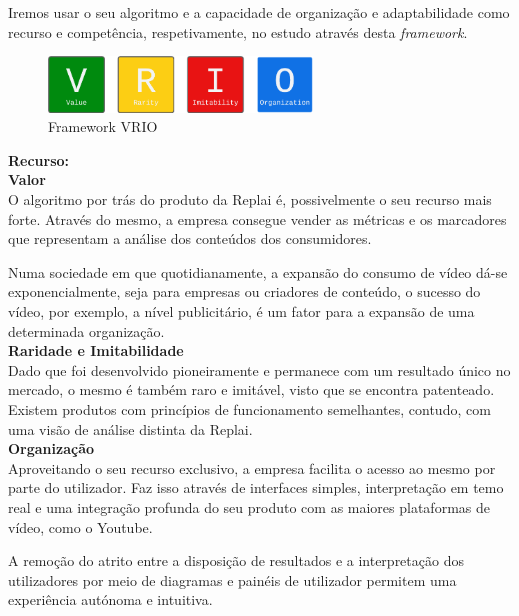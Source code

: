 Iremos usar o seu algoritmo e a capacidade de organização e adaptabilidade como recurso e competência, respetivamente, no estudo através desta \textit{framework}.\\

\begin{figure}[ht]
    \centering
        \includegraphics[width=7cm]{images/vrio.png}
        \caption{Framework VRIO}
        \label{fig:vrio}
\end{figure}

\noindent \textbf{Recurso:} \\

\noindent \textbf{Valor}\\
 
O algoritmo por trás do produto da Replai é, possivelmente o seu recurso mais forte. Através do  mesmo, a empresa consegue vender as métricas e os marcadores que representam a análise dos conteúdos dos consumidores.
  
Numa sociedade em que quotidianamente, a expansão do consumo de vídeo dá-se exponencialmente, seja para empresas ou criadores de conteúdo, o sucesso do vídeo, por exemplo, a nível publicitário, é um fator para a expansão de uma determinada organização.\\

\noindent \textbf{Raridade e Imitabilidade}\\

Dado que foi desenvolvido pioneiramente e permanece com um resultado único no mercado, o mesmo é também raro e imitável, visto que se encontra patenteado. Existem produtos com princípios de funcionamento semelhantes, contudo, com uma visão de análise distinta da Replai.\\

\noindent \textbf{Organização}\\
  
Aproveitando o seu recurso exclusivo, a empresa facilita o acesso ao mesmo por parte do utilizador. Faz isso através de interfaces simples, interpretação em temo real e uma integração profunda do seu produto com as maiores plataformas de vídeo, como o Youtube.
  
A remoção do atrito entre a disposição de resultados e a interpretação dos utilizadores por meio de diagramas e painéis de utilizador permitem uma experiência autónoma e intuitiva.\\

